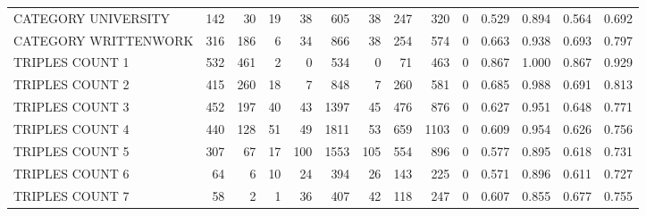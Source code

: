 \begin{tabular}{lrrrrrrrrrllll}
 CATEGORY UNIVERSITY      &             142 &            30 &              19 &              38 &             605 &   38 &  247 &  320 &    0 & 0.529 & 0.894 & 0.564 & 0.692 \\
 CATEGORY WRITTENWORK     &             316 &           186 &               6 &              34 &             866 &   38 &  254 &  574 &    0 & 0.663 & 0.938 & 0.693 & 0.797 \\
 TRIPLES COUNT 1          &             532 &           461 &               2 &               0 &             534 &    0 &   71 &  463 &    0 & 0.867 & 1.000 & 0.867 & 0.929 \\
 TRIPLES COUNT 2          &             415 &           260 &              18 &               7 &             848 &    7 &  260 &  581 &    0 & 0.685 & 0.988 & 0.691 & 0.813 \\
 TRIPLES COUNT 3          &             452 &           197 &              40 &              43 &            1397 &   45 &  476 &  876 &    0 & 0.627 & 0.951 & 0.648 & 0.771 \\
 TRIPLES COUNT 4          &             440 &           128 &              51 &              49 &            1811 &   53 &  659 & 1103 &    0 & 0.609 & 0.954 & 0.626 & 0.756 \\
 TRIPLES COUNT 5          &             307 &            67 &              17 &             100 &            1553 &  105 &  554 &  896 &    0 & 0.577 & 0.895 & 0.618 & 0.731 \\
 TRIPLES COUNT 6          &              64 &             6 &              10 &              24 &             394 &   26 &  143 &  225 &    0 & 0.571 & 0.896 & 0.611 & 0.727 \\
 TRIPLES COUNT 7          &              58 &             2 &               1 &              36 &             407 &   42 &  118 &  247 &    0 & 0.607 & 0.855 & 0.677 & 0.755 \\
\hline
\end{tabular}